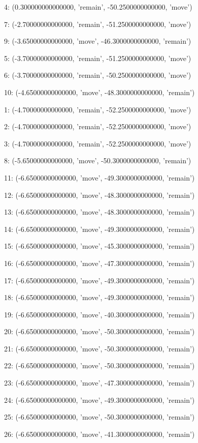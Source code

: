4: (0.300000000000000, 'remain', -50.2500000000000, 'move')


7: (-2.70000000000000, 'remain', -51.2500000000000, 'move')


9: (-3.65000000000000, 'move', -46.3000000000000, 'remain')


5: (-3.70000000000000, 'remain', -51.2500000000000, 'move')


6: (-3.70000000000000, 'remain', -50.2500000000000, 'move')


10: (-4.65000000000000, 'move', -48.3000000000000, 'remain')


1: (-4.70000000000000, 'remain', -52.2500000000000, 'move')


2: (-4.70000000000000, 'remain', -52.2500000000000, 'move')


3: (-4.70000000000000, 'remain', -52.2500000000000, 'move')


8: (-5.65000000000000, 'move', -50.3000000000000, 'remain')


11: (-6.65000000000000, 'move', -49.3000000000000, 'remain')


12: (-6.65000000000000, 'move', -48.3000000000000, 'remain')


13: (-6.65000000000000, 'move', -48.3000000000000, 'remain')


14: (-6.65000000000000, 'move', -49.3000000000000, 'remain')


15: (-6.65000000000000, 'move', -45.3000000000000, 'remain')


16: (-6.65000000000000, 'move', -47.3000000000000, 'remain')


17: (-6.65000000000000, 'move', -49.3000000000000, 'remain')


18: (-6.65000000000000, 'move', -49.3000000000000, 'remain')


19: (-6.65000000000000, 'move', -40.3000000000000, 'remain')


20: (-6.65000000000000, 'move', -50.3000000000000, 'remain')


21: (-6.65000000000000, 'move', -50.3000000000000, 'remain')


22: (-6.65000000000000, 'move', -50.3000000000000, 'remain')


23: (-6.65000000000000, 'move', -47.3000000000000, 'remain')


24: (-6.65000000000000, 'move', -49.3000000000000, 'remain')


25: (-6.65000000000000, 'move', -50.3000000000000, 'remain')


26: (-6.65000000000000, 'move', -41.3000000000000, 'remain')


